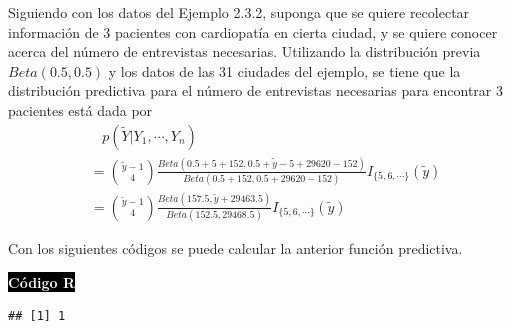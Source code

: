     \begin{Eje}
    Siguiendo con los datos del Ejemplo 2.3.2, suponga que se quiere recolectar informaci\'on de 3 pacientes con cardiopat\'ia en cierta ciudad, y se quiere conocer acerca del n\'umero de entrevistas necesarias. Utilizando la distribuci\'on previa $Beta(0.5,0.5)$ y los datos de las 31 ciudades del ejemplo, se tiene que la distribuci\'on predictiva para el n\'umero de entrevistas necesarias para encontrar 3 pacientes est\'a dada por
    \begin{align*}
    &\ \ \ \ p(\tilde{Y}|Y_1,\cdots,Y_n)\\
    &=\binom{\tilde{y}-1}{4}\frac{Beta(0.5+5+152,0.5+\tilde{y}-5+29620-152)}{Beta(0.5+152,0.5+29620-152)}I_{\{5,6,\cdots\}}(\tilde{y})\\
    &=\binom{\tilde{y}-1}{4}\frac{Beta(157.5,\tilde{y}+29463.5)}{Beta(152.5,29468.5)}I_{\{5,6,\cdots\}}(\tilde{y})
    \end{align*}
    
    Con los siguientes c\'odigos se puede calcular la anterior funci\'on predictiva.
    
    \colorbox{black}{\textcolor{white}{\textbf{C\'odigo R}}}
\begin{knitrout}
\color{fgcolor}\begin{kframe}
\begin{alltt}
\hlkwb{<-}\hlstd{(}\hlstd{,}\hlstd{,}\hlstd{,}\hlstd{,}\hlstd{,}\hlstd{)\{}
\hlopt{-}\hlopt{-}\hlstd{)}\hlopt{*}\hlstd{(}\hlopt{+}\hlopt{+}\hlopt{+}\hlopt{-}\hlopt{+}\hlopt{-}\hlopt{-}\hlopt{+}\hlopt{+}\hlopt{-}
\hlstd{\}}

 \hlkwb{<-}  \hlkwb{<-} 
 \hlkwb{<-}  \hlkwb{<-}  \hlkwb{<-} 
 \hlkwb{<-} \hlstd{(}\hlstd{)}
  \hlopt{:}\hlstd{)\{}
\hlstd{fun[y}\hlopt{-}\hlstd{]} \hlkwb{<-} 
\hlstd{\}}
\end{alltt}
\begin{verbatim}
## [1] 1
\end{verbatim}
\end{kframe}
\end{knitrout}
    

\end{Eje}
